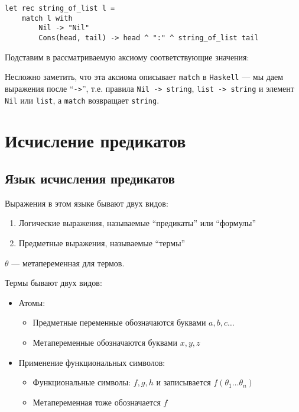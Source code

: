 \documentclass[12pt, a4paper, oneside]{book}
\begin{document}
\begin{verbatim}
let rec string_of_list l =
    match l with
        Nil -> "Nil"
        Cons(head, tail) -> head ^ ":" ^ string_of_list tail
\end{verbatim}

Подставим в рассматриваемую аксиому соответствующие значения:
\begin{center}
    \begin{prooftree}
    \end{prooftree}
\end{center}

Несложно заметить, что эта аксиома описывает \texttt{match} в \texttt{Haskell} --- мы даем выражения после ``\texttt{->}'', т.е. правила \texttt{Nil -> string}, \texttt{list -> string} и элемент \texttt{Nil} или \texttt{list}, а \texttt{match} возвращает \texttt{string}.

\section{Исчисление предикатов}

\subsection{Язык исчисления предикатов}

Выражения в этом языке бывают двух видов:
\begin{enumerate}
    \item Логические выражения, называемые ``предикаты'' или ``формулы''
    \item Предметные выражения, называемые ``термы''
\end{enumerate}

\(\theta\) --- метапеременная для термов.

Термы бывают двух видов:
\begin{itemize}
    \item Атомы:
          \begin{itemize}
              \item Предметные переменные обозначаются буквами \(a,b,c \dots \)
              \item Метапеременные обозначаются буквами \(x,y,z\)
          \end{itemize}
    \item Применение функциональных символов:
          \begin{itemize}
              \item Функциональные символы: \(f,g,h\) и записывается \(f(\theta_1 \dots \theta_n)\)
              \item Метапеременная тоже обозначается \(f\)
          \end{itemize}
\end{itemize}
\end{document}
